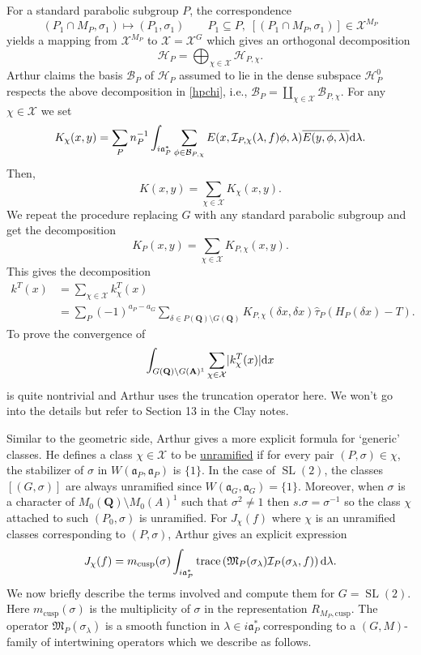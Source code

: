 \documentclass[11pt]{amsart}
\def\apg{a_{P} - a_{G}}
\def\A{\mathbf A}
\def\Q{\mathbf Q}
\def\BBB{\mathcal B}
\def\HHH{\mathcal H}
\def\III{\mathcal I}
\def\MMM{\mathfrak M}	%
\def\XXX{\mathcal X}
\def\aaa{\mathfrak a}
\def\cb#1{{\color{blue}#1}}
\def\d{\text d}
\def\bs{\setminus} 			%
\def\cusp{\text{cusp}}
\def\mod#1{\lvert #1 \rvert} %
\def\sl{\operatorname{SL}}
\def\trace{\operatorname{trace}}
\theoremstyle{remark}
\begin{document}
For a standard parabolic subgroup $P$, the correspondence
\[ (P_1\cap M_P, \sigma_1) \mapsto (P_1, \sigma_1) \qquad P_1 \subseteq P, \; [(P_1 \cap M_P, \sigma_1)] \in \XXX^{M_P} \]
yields a mapping from $\XXX^{M_P}$ to $\XXX = \XXX^G$ which gives an orthogonal decomposition
\[ \HHH_P = \bigoplus_{\chi \in \XXX} \HHH_{P, \chi}. \]
Arthur claims the basis $\BBB_P$ of $\HHH_P$ assumed to lie in the dense subspace $\HHH_P^0$ respects the above decomposition in \cref{hpchi}, i.e., $\BBB_P = \coprod_{\chi \in \XXX} \BBB_{P, \chi}$. For any $\chi \in \XXX$ we set
\[ K_\chi(x, y) = \sum_P n_P^{-1} \int_{i\aaa_P^*} \sum_{\phi \in \BBB_{P, \chi}}
		E(x, \III_{P, \chi}(\lambda, f)\phi, \lambda) \overline{E(y, \phi, \lambda)} \d \lambda. \]
Then,
\[ K(x, y) = \sum_{\chi \in \XXX} K_\chi(x, y). \]
We repeat the procedure replacing $G$ with any standard parabolic subgroup and get the decomposition 
\[ K_P(x, y) = \sum_{\chi \in \XXX} K_{P, \chi}(x, y). \]
This gives the decomposition
\begin{align*}
	k^T(x) & = \sum_{\chi \in \XXX} k_\chi^T(x) \\
			& = \sum_P (-1)^{\apg} \sum_{\delta \in P(\Q)\bs G(\Q)} K_{P, \chi}(\delta x, \delta x)
				\hat\tau_P(H_P(\delta x) - T).
\end{align*}
To prove the convergence of 
\[ \int_{G(\Q)\bs G(\A)^1} \sum_{\chi \in \XXX} \mod{k_\chi^T (x)} \d x \]
is quite nontrivial and Arthur uses the truncation operator here. We won't go into the details but refer to Section 13 in the Clay notes. 

Similar to the geometric side, Arthur gives a more explicit formula for `generic' classes. He defines a class $\chi \in \XXX$ to be \underline{unramified} if for every pair $(P, \sigma) \in \chi$, the stabilizer of $\sigma$ in $W(\aaa_P, \aaa_P)$ is $\{1\}$. \cb{In the case of $\sl(2)$, the classes $[(G, \sigma)]$ are always unramified since $W(\aaa_G, \aaa_G) = \{1\}$. Moreover, when $\sigma$ is a character of $M_0(\Q)\bs M_0(A)^1$ such that $\sigma^2 \neq 1$ then $s.\sigma = \sigma^{-1}$ so the class $\chi$ attached to such $(P_0, \sigma)$ is unramified. 
}
For $J_\chi(f)$ where $\chi$ is an unramified classes corresponding to $(P, \sigma)$, Arthur gives an explicit expression
\[ J_\chi(f) = m_{\cusp}(\sigma) \int_{i\aaa_P^*} \trace\left(\MMM_P(\sigma_\lambda) \III_P(\sigma_\lambda, f)\right) \d \lambda. \]
We now briefly describe the terms involved and compute them for $G=\sl(2)$. Here $m_{\cusp}(\sigma)$ is the multiplicity of $\sigma$ in the representation $R_{M_P, \cusp}$. The operator $\MMM_P(\sigma_\lambda)$ is a smooth function in $\lambda \in i\aaa_P^*$ corresponding to a $(G, M)$-family of intertwining operators which we describe as follows. 
\end{document}
